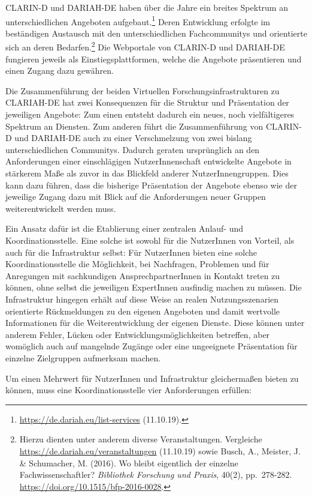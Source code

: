 \documentclass[a4paper,
fontsize=11pt,
oneside,
numbers=noperiodatend,
parskip=half-,
bibliography=totoc,
final
]{scrartcl}
\begin{document}
CLARIN-D und DARIAH-DE haben über die Jahre ein breites Spektrum an
unterschiedlichen Angeboten aufgebaut.\footnote{\url{https://de.dariah.eu/list-services}
  (11.10.19).} Deren Entwicklung erfolgte im beständigen Austausch mit
den unterschiedlichen Fachcommunitys und orientierte sich an deren
Bedarfen.\footnote{Hierzu dienten unter anderem diverse Veranstaltungen.
  Vergleiche \url{https://de.dariah.eu/veranstaltungen} (11.10.19) sowie
  Busch, A., Meister, J. \& Schumacher, M. (2016). Wo bleibt eigentlich
  der einzelne Fachwissenschaftler? \emph{Bibliothek Forschung und
  Praxis}, 40(2), pp.~278-282.
  \url{https://doi.org/10.1515/bfp-2016-0028}.} Die Webportale von
CLARIN-D und DARIAH-DE fungieren jeweils als Einstiegsplattformen,
welche die Angebote präsentieren und einen Zugang dazu gewähren.

Die Zusammenführung der beiden Virtuellen Forschungsinfrastrukturen zu
CLARIAH-DE hat zwei Konsequenzen für die Struktur und Präsentation der
jeweiligen Angebote: Zum einen entsteht dadurch ein neues, noch
vielfältigeres Spektrum an Diensten. Zum anderen führt die
Zusammenführung von CLARIN-D und DARIAH-DE auch zu einer Verschmelzung
von zwei bislang unterschiedlichen Communitys. Dadurch geraten
ursprünglich an den Anforderungen einer einschlägigen NutzerInnenschaft
entwickelte Angebote in stärkerem Maße als zuvor in das Blickfeld
anderer NutzerInnengruppen. Dies kann dazu führen, dass die bisherige
Präsentation der Angebote ebenso wie der jeweilige Zugang dazu mit Blick
auf die Anforderungen neuer Gruppen weiterentwickelt werden muss.

Ein Ansatz dafür ist die Etablierung einer zentralen Anlauf- und
Koordinationsstelle. Eine solche ist sowohl für die NutzerInnen von
Vorteil, als auch für die Infrastruktur selbst: Für NutzerInnen bieten
eine solche Koordinationsstelle die Möglichkeit, bei Nachfragen,
Problemen und für Anregungen mit sachkundigen AnsprechpartnerInnen in
Kontakt treten zu können, ohne selbst die jeweiligen ExpertInnen
ausfindig machen zu müssen. Die Infrastruktur hingegen erhält auf diese
Weise an realen Nutzungsszenarien orientierte Rückmeldungen zu den
eigenen Angeboten und damit wertvolle Informationen für die
Weiterentwicklung der eigenen Dienste. Diese können unter anderem
Fehler, Lücken oder Entwicklungsmöglichkeiten betreffen, aber womöglich
auch auf mangelnde Zugänge oder eine ungeeignete Präsentation für
einzelne Zielgruppen aufmerksam machen.

Um einen Mehrwert für NutzerInnen und Infrastruktur gleichermaßen bieten
zu können, muss eine Koordinationsstelle vier Anforderungen erfüllen:
\end{document}
